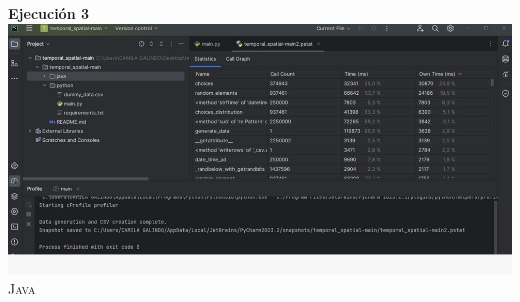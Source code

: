 \documentclass[a4paper,twocolumn,10pt]{article}
\begin{document}
\textbf{Ejecución 3\\}
\includegraphics[width=0.9\linewidth]{Lenovo AMD 3020e/Prueba python 3.jpeg}\\

\textsc{Java}
\end{document}
